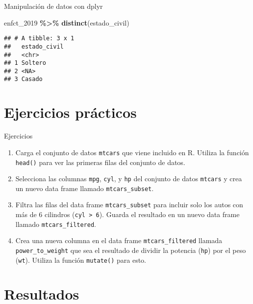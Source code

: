 \documentclass[
  ignorenonframetext,
]{beamer}
\newenvironment{Shaded}{\begin{snugshade}}{\end{snugshade}}
\newcommand{\FunctionTok}[1]{\textcolor[rgb]{0.13,0.29,0.53}{\textbf{#1}}}
\newcommand{\NormalTok}[1]{#1}
\newcommand{\SpecialCharTok}[1]{\textcolor[rgb]{0.81,0.36,0.00}{\textbf{#1}}}
\begin{document}
\begin{frame}[fragile]{Manipulación de datos con dplyr}
\label{manipulaciuxf3n-de-datos-con-dplyr-9}
\begin{Shaded}
\begin{Highlighting}[]
\NormalTok{enfct\_2019 }\SpecialCharTok{\%\textgreater{}\%} \FunctionTok{distinct}\NormalTok{(estado\_civil)}
\end{Highlighting}
\end{Shaded}

\begin{verbatim}
## # A tibble: 3 x 1
##   estado_civil
##   <chr>       
## 1 Soltero     
## 2 <NA>        
## 3 Casado
\end{verbatim}
\end{frame}

\section{Ejercicios prácticos}\label{ejercicios-pruxe1cticos}

\begin{frame}[fragile]{Ejercicios}
\label{ejercicios-1}
\begin{enumerate}
\item
  Carga el conjunto de datos \texttt{mtcars} que viene incluido en R.
  Utiliza la función \texttt{head()} para ver las primeras filas del
  conjunto de datos.
\item
  Selecciona las columnas \texttt{mpg}, \texttt{cyl}, y \texttt{hp} del
  conjunto de datos \texttt{mtcars} y crea un nuevo data frame llamado
  \texttt{mtcars\_subset}.
\item
  Filtra las filas del data frame \texttt{mtcars\_subset} para incluir
  solo los autos con más de 6 cilindros
  (\texttt{cyl\ \textgreater{}\ 6}). Guarda el resultado en un nuevo
  data frame llamado \texttt{mtcars\_filtered}.
\item
  Crea una nueva columna en el data frame \texttt{mtcars\_filtered}
  llamada \texttt{power\_to\_weight} que sea el resultado de dividir la
  potencia (\texttt{hp}) por el peso (\texttt{wt}). Utiliza la función
  \texttt{mutate()} para esto.
\end{enumerate}
\end{frame}

\section{Resultados}\label{resultados-4}
\end{document}

